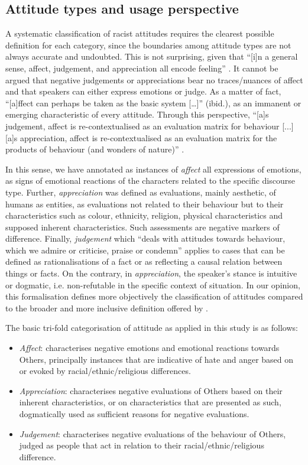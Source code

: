 \documentclass[output=paper]{LSP/langsci}
\begin{document}
\subsection{Attitude types and usage perspective} \label{sec:2:4:2}

A systematic classification of racist attitudes requires the clearest possible definition for each category, since the boundaries among attitude types are not always accurate and undoubted. This is not surprising, given that “[i]n a general sense, affect, judgement, and appreciation all encode feeling” \citep[147]{Martin2000}. It cannot be argued that negative judgements or appreciations bear no traces/nuances of affect and that speakers can either express emotions or judge. As a matter of fact, “[a]ffect can perhaps be taken as the basic system […]” (ibid.), as an immanent or emerging characteristic of every attitude. Through this perspective, “[a]s judgement, affect is re-contextualised as an evaluation matrix for behaviour [...] [a]s appreciation, affect is re-contextualised as an evaluation matrix for the products of behaviour (and wonders of nature)” \citep[147]{Martin2000}.

In this sense, we have annotated as instances of \textit{affect} all expressions of emotions, as signs of emotional reactions of the characters related to the specific discourse type. Further, \textit{appreciation} was defined as evaluations, mainly aesthetic, of humans as entities, as evaluations not related to their behaviour but to their characteristics such as colour, ethnicity, religion, physical characteristics and supposed inherent characteristics. Such assessments are negative markers of difference. Finally, \textit{judgement} which “deals with attitudes towards behaviour, which we admire or criticise, praise or condemn” \citep[42]{MartinWhite2005} applies to cases that can be defined as rationalisations of a fact or as reflecting a causal relation between things or facts. On the contrary, in \textit{appreciation}, the speaker's stance is intuitive or dogmatic, i.e. non-refutable in the specific context of situation. In our opinion, this formalisation defines more objectively the classification of attitudes compared to the broader and more inclusive definition offered by \citet[42--45]{MartinWhite2005}.

The basic tri-fold categorisation of attitude as applied in this study is as follows:

\begin{itemize}
\item \textit{Affect}: characterises negative emotions and emotional reactions towards Others, principally instances that are indicative of hate and anger based on or evoked by racial/ethnic/religious differences.
\item \textit{Appreciation}: characterises negative evaluations of Others based on their inherent characteristics, or on characteristics that are presented as such, dogmatically used as sufficient reasons for negative evaluations.
\item \textit{Judgement}: characterises negative evaluations of the behaviour of Others, judged as people that act in relation to their racial/ethnic/religious difference.
\end{itemize}
\end{document}
